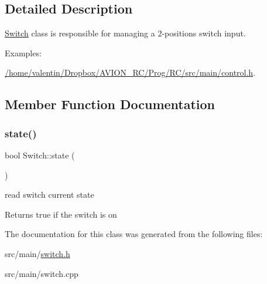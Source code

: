 \subsection{Detailed Description}
\hyperlink{class_switch}{Switch} class is responsible for managing a 2-\/positions switch input. \begin{Desc}
\item[Examples\+: ]\par
\hyperlink{_2home_2valentin_2_dropbox_2_a_v_i_o_n__r_c_2_prog_2_r_c_2src_2main_2control_8h-example}{/home/valentin/\+Dropbox/\+A\+V\+I\+O\+N\+\_\+\+R\+C/\+Prog/\+R\+C/src/main/control.\+h}.\end{Desc}


\subsection{Member Function Documentation}
\mbox{\label{class_switch_ac9b4369bd630f9d975f2bd82933f7cc6}} 
\subsubsection{\texorpdfstring{state()}{state()}}
{\footnotesize\ttfamily bool Switch\+::state (\begin{DoxyParamCaption}{ }\end{DoxyParamCaption})}



read switch current state 

\begin{DoxyReturn}{Returns}
true if the switch is on 
\end{DoxyReturn}


The documentation for this class was generated from the following files\+:\begin{DoxyCompactItemize}
\item 
src/main/\hyperlink{switch_8h}{switch.\+h}\item 
src/main/switch.\+cpp\end{DoxyCompactItemize}
